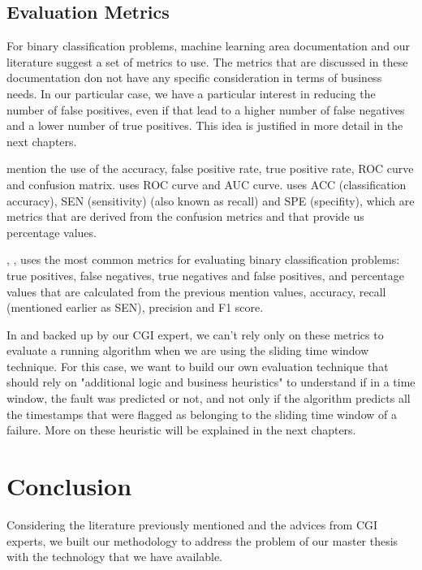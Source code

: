 \subsection{Evaluation Metrics}

For binary classification problems, machine learning area documentation and our literature suggest a set of metrics to use. The metrics that are discussed in these documentation don not have any specific consideration in terms of business needs. In our particular case, we have a particular interest in reducing the number of false positives, even if that lead to a higher number of false negatives and a lower number of true positives. This idea is justified in more detail in the next chapters.

\cite{OLD_31} mention the use of the accuracy, false positive rate, true positive rate, ROC curve and confusion matrix. \cite{OLD_18_WIND} uses ROC curve and AUC curve. 
\cite{N_3_WIND} uses ACC (classification accuracy), SEN (sensitivity) (also known as recall) and SPE (specifity), which are metrics that are derived from the confusion metrics and that provide us percentage values.

\cite{OLD_41_WIND}, \cite{ML_Alg_Analysis_2}, uses the most common metrics for evaluating binary classification problems: true positives, false negatives, true negatives and false positives, and percentage values that are calculated from the previous mention values, accuracy, recall (mentioned earlier as SEN), precision and F1 score.

In \cite{MED_1} and backed up by our CGI expert, we can't rely only on these metrics to evaluate a running algorithm when we are using the sliding time window technique. For this case, we want to build our own evaluation technique that should rely on "additional logic and business heuristics" \cite{MED_1} to understand if in a time window, the fault was predicted or not, and not only if the algorithm predicts all the timestamps that were flagged as belonging to the sliding time window of a failure. More on these heuristic will be explained in the next chapters.


\section{Conclusion} 
\label{sub:if_you_use_this_template} 

Considering the literature previously mentioned and the advices from CGI experts, we built our methodology to address the problem of our master thesis with the technology that we have available.

